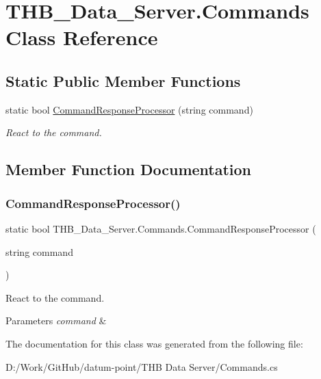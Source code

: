 \hypertarget{class_t_h_b___data___server_1_1_commands}{}\section{T\+H\+B\+\_\+\+Data\+\_\+\+Server.\+Commands Class Reference}
\label{class_t_h_b___data___server_1_1_commands}
\subsection*{Static Public Member Functions}
\begin{DoxyCompactItemize}
\item 
static bool \mbox{\hyperlink{class_t_h_b___data___server_1_1_commands_a996531160e55feb986342fac81c89d71}{Command\+Response\+Processor}} (string command)
\begin{DoxyCompactList}\small\item\em React to the command. \end{DoxyCompactList}\end{DoxyCompactItemize}


\subsection{Member Function Documentation}
\mbox{\label{class_t_h_b___data___server_1_1_commands_a996531160e55feb986342fac81c89d71}} 
\subsubsection{\texorpdfstring{Command\+Response\+Processor()}{CommandResponseProcessor()}}
{\footnotesize\ttfamily static bool T\+H\+B\+\_\+\+Data\+\_\+\+Server.\+Commands.\+Command\+Response\+Processor (\begin{DoxyParamCaption}\item[{string}]{command }\end{DoxyParamCaption})\hspace{0.3cm}{\ttfamily [static]}}



React to the command. 


\begin{DoxyParams}{Parameters}
{\em command} & \\
\hline
\end{DoxyParams}


The documentation for this class was generated from the following file\+:\begin{DoxyCompactItemize}
\item 
D\+:/\+Work/\+Git\+Hub/datum-\/point/\+T\+H\+B Data Server/Commands.\+cs\end{DoxyCompactItemize}
